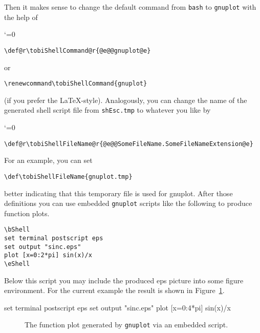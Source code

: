 Then it makes sense to change the default command from
\texttt{bash} to \texttt{gnuplot} with the help of
{
\catcode`\@=0
\relax
\begin{verbatim}
\def@r\tobiShellCommand@r{@e@@gnuplot@e}
\end{verbatim}
or
\begin{verbatim}
\renewcommand\tobiShellCommand{gnuplot}
\end{verbatim}
}
(if you prefer the \LaTeX-style).
Analogously, you can change the name of the generated shell script
file from \texttt{shEsc.tmp} to whatever you like by
{
\catcode`\@=0
\relax
\begin{verbatim}
\def@r\tobiShellFileName@r{@e@@SomeFileName.SomeFileNameExtension@e}
\end{verbatim}
}
For an example, you can set
\begin{verbatim}
\def\tobiShellFileName{gnuplot.tmp}
\end{verbatim}
better indicating that this temporary file is used for gnuplot.
\def\tobiShellCommand{gnuplot} \def\tobiShellFileName{gnuplot.tmp}
After those definitions you can use embedded \texttt{gnuplot} scripts
like the following to produce function plots.
\begin{verbatim}
\bShell
set terminal postscript eps
set output "sinc.eps"
plot [x=0:2*pi] sin(x)/x
\eShell
\end{verbatim}
Below this script you may include the produced eps picture into some figure
environment. For the current example the result is shown in
Figure~\ref{fig:sinc}.

\bShell
set terminal postscript eps
set output "sinc.eps"
plot [x=0:4*pi] sin(x)/x
\eShell
\begin{figure}
  \centering
  \caption{The function plot generated by \texttt{gnuplot} via an
    embedded script.}
  \label{fig:sinc}
\end{figure}


